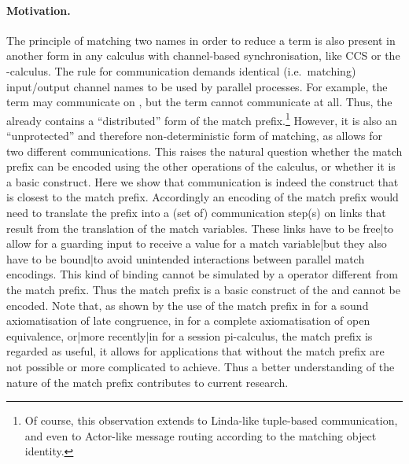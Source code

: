 \documentclass[]{article}
\begin{document}
\paragraph{Motivation.} The principle of matching two names in order to reduce a term is also present in another form in any calculus with channel-based synchronisation, like CCS or the -calculus.
The rule for communication demands identical (i.e.~matching) input/output channel names to be used by parallel processes. For example, the term  may communicate on , but the term  cannot communicate at all. Thus, the \piCal already contains a ``distributed'' form of the match prefix.\footnote{Of course, this observation extends to Linda-like tuple-based communication, and even to Actor-like message routing according to the matching object identity.} However, it is also an ``unprotected'' and therefore non-deterministic form of matching, as  allows for two different communications. This raises the natural question whether the match prefix can be encoded using the other operations of the calculus, or whether it is a basic construct.
Here we show that communication is indeed the \piCal construct that is closest to the match prefix.
Accordingly an encoding of the match prefix would need to translate the prefix into a (set of) communication step(s) on links that result from the translation of the match variables. These links have to be free|to allow for a guarding input to receive a value for a match variable|but they also have to be bound|to avoid unintended interactions between parallel match encodings. This kind of binding cannot be simulated by a \piCal operator different from the match prefix.
Thus the match prefix is a basic construct of the \piCal and cannot be encoded.
Note that, as shown by the use of the match prefix \eg in \cite{milnerParrowWalker92} for a sound axiomatisation of late congruence, in \cite{sangiorgi96} for a complete axiomatisation of open equivalence, {or}|{more recently}|{in} \cite{giunti13} for a session pi-calculus, the match prefix is regarded as useful, \ie it allows for applications that without the match prefix are not possible or more complicated to achieve.
Thus a better understanding of the nature of the match prefix contributes to current research.
\end{document}
